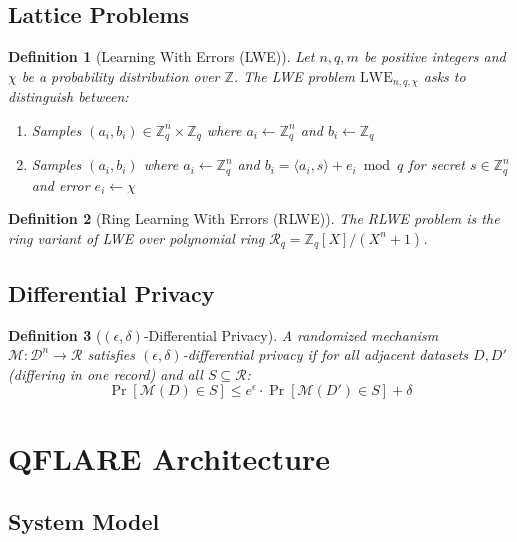 \documentclass[journal]{IEEEtran}
\newtheorem{definition}{Definition}
\begin{document}
\subsection{Lattice Problems}

\begin{definition}[Learning With Errors (LWE)]
Let $n, q, m$ be positive integers and $\chi$ be a probability distribution over $\mathbb{Z}$. The LWE problem $\text{LWE}_{n,q,\chi}$ asks to distinguish between:
\begin{enumerate}
\item Samples $(a_i, b_i) \in \mathbb{Z}_q^n \times \mathbb{Z}_q$ where $a_i \leftarrow \mathbb{Z}_q^n$ and $b_i \leftarrow \mathbb{Z}_q$
\item Samples $(a_i, b_i)$ where $a_i \leftarrow \mathbb{Z}_q^n$ and $b_i = \langle a_i, s \rangle + e_i \bmod q$ for secret $s \in \mathbb{Z}_q^n$ and error $e_i \leftarrow \chi$
\end{enumerate}
\end{definition}

\begin{definition}[Ring Learning With Errors (RLWE)]
The RLWE problem is the ring variant of LWE over polynomial ring $\mathcal{R}_q = \mathbb{Z}_q[X]/(X^n + 1)$.
\end{definition}

\subsection{Differential Privacy}

\begin{definition}[$(\epsilon, \delta)$-Differential Privacy]
A randomized mechanism $\mathcal{M}: \mathcal{D}^n \rightarrow \mathcal{R}$ satisfies $(\epsilon, \delta)$-differential privacy if for all adjacent datasets $D, D'$ (differing in one record) and all $S \subseteq \mathcal{R}$:
$$\Pr[\mathcal{M}(D) \in S] \leq e^\epsilon \cdot \Pr[\mathcal{M}(D') \in S] + \delta$$
\end{definition}

\section{QFLARE Architecture}

\subsection{System Model}
\end{document}
